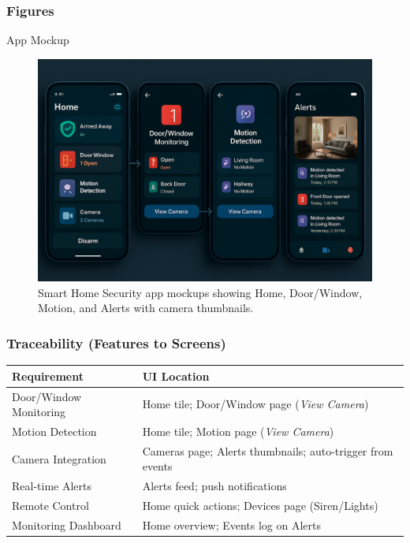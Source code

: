 \documentclass[conference]{IEEEtran}
\begin{document}
\subsubsection{Figures}
App Mockup
\begin{figure}[h]
  \centering
  \includegraphics[width=\linewidth]{AppMockup.png}
  \caption{Smart Home Security app mockups showing Home, Door/Window, Motion, and Alerts with camera thumbnails.}
\end{figure}

\FloatBarrier

\subsubsection{Traceability (Features to Screens)}
\begin{center}
\begin{tabularx}{\linewidth}{@{}lX@{}}
\toprule
\textbf{Requirement} & \textbf{UI Location} \\\midrule
Door/Window Monitoring & Home tile; Door/Window page (\emph{View Camera}) \\
Motion Detection & Home tile; Motion page (\emph{View Camera}) \\
Camera Integration & Cameras page; Alerts thumbnails; auto-trigger from events \\
Real-time Alerts & Alerts feed; push notifications \\
Remote Control & Home quick actions; Devices page (Siren/Lights) \\
Monitoring Dashboard & Home overview; Events log on Alerts \\
\bottomrule
\end{tabularx}
\end{center}
\end{document}
